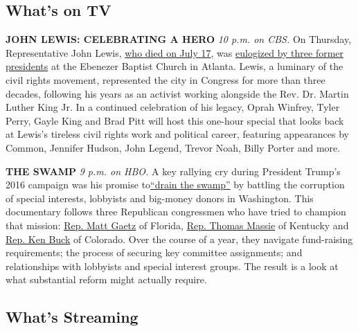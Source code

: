 \hypertarget{whats-on-tv}{%
\subsection{What's on TV}\label{whats-on-tv}}

\textbf{JOHN LEWIS: CELEBRATING A HERO} \emph{10 p.m. on CBS.} On
Thursday, Representative John Lewis,
\href{https://www.nytimes3xbfgragh.onion/2020/07/17/us/john-lewis-dead.html}{who
died on July 17}, was
\href{https://www.nytimes3xbfgragh.onion/2020/07/30/us/john-lewis-live-funeral.html?searchResultPosition=8}{eulogized
by three former presidents} at the Ebenezer Baptist Church in Atlanta.
Lewis, a luminary of the civil rights movement, represented the city in
Congress for more than three decades, following his years as an activist
working alongside the Rev. Dr. Martin Luther King Jr. In a continued
celebration of his legacy, Oprah Winfrey, Tyler Perry, Gayle King and
Brad Pitt will host this one-hour special that looks back at Lewis's
tireless civil rights work and political career, featuring appearances
by Common, Jennifer Hudson, John Legend, Trevor Noah, Billy Porter and
more.

\textbf{THE SWAMP} \emph{9 p.m. on HBO.} A key rallying cry during
President Trump's 2016 campaign was his promise
to\href{https://www.nytimes3xbfgragh.onion/2020/07/06/us/politics/trump-lobbyists-swamp-campaign.html}{``drain
the swamp''} by battling the corruption of special interests, lobbyists
and big-money donors in Washington. This documentary follows three
Republican congressmen who have tried to champion that mission:
\href{https://www.nytimes3xbfgragh.onion/2019/03/30/us/politics/matt-gaetz-trump.html}{Rep.
Matt Gaetz} of Florida,
\href{https://www.nytimes3xbfgragh.onion/2020/03/27/us/politics/thomas-massie-coronavirus.html?searchResultPosition=5}{Rep.
Thomas Massie} of Kentucky and
\href{https://www.nytimes3xbfgragh.onion/2019/04/03/us/politics/trump-republican-party.html?searchResultPosition=12}{Rep.
Ken Buck} of Colorado. Over the course of a year, they navigate
fund-raising requirements; the process of securing key committee
assignments; and relationships with lobbyists and special interest
groups. The result is a look at what substantial reform might actually
require.

\hypertarget{whats-streaming}{%
\subsection{What's Streaming}\label{whats-streaming}}

